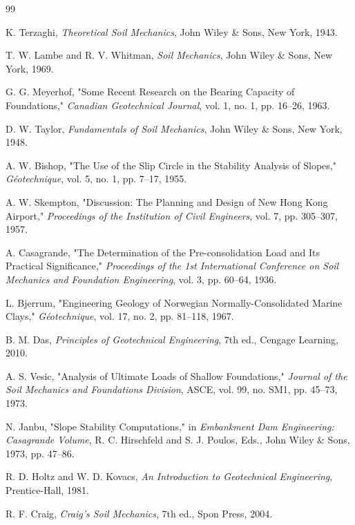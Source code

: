 \documentclass[11pt,a4paper]{article}
\begin{document}

\begin{thebibliography}{99}

K. Terzaghi, \textit{Theoretical Soil Mechanics}, John Wiley \& Sons, New York, 1943.

T. W. Lambe and R. V. Whitman, \textit{Soil Mechanics}, John Wiley \& Sons, New York, 1969.

G. G. Meyerhof, "Some Recent Research on the Bearing Capacity of Foundations," \textit{Canadian Geotechnical Journal}, vol. 1, no. 1, pp. 16--26, 1963.

D. W. Taylor, \textit{Fundamentals of Soil Mechanics}, John Wiley \& Sons, New York, 1948.

A. W. Bishop, "The Use of the Slip Circle in the Stability Analysis of Slopes," \textit{Géotechnique}, vol. 5, no. 1, pp. 7--17, 1955.

A. W. Skempton, "Discussion: The Planning and Design of New Hong Kong Airport," \textit{Proceedings of the Institution of Civil Engineers}, vol. 7, pp. 305--307, 1957.

A. Casagrande, "The Determination of the Pre-consolidation Load and Its Practical Significance," \textit{Proceedings of the 1st International Conference on Soil Mechanics and Foundation Engineering}, vol. 3, pp. 60--64, 1936.

L. Bjerrum, "Engineering Geology of Norwegian Normally-Consolidated Marine Clays," \textit{Géotechnique}, vol. 17, no. 2, pp. 81--118, 1967.

B. M. Das, \textit{Principles of Geotechnical Engineering}, 7th ed., Cengage Learning, 2010.

A. S. Vesic, "Analysis of Ultimate Loads of Shallow Foundations," \textit{Journal of the Soil Mechanics and Foundations Division}, ASCE, vol. 99, no. SM1, pp. 45--73, 1973.

N. Janbu, "Slope Stability Computations," in \textit{Embankment Dam Engineering: Casagrande Volume}, R. C. Hirschfeld and S. J. Poulos, Eds., John Wiley \& Sons, 1973, pp. 47--86.

R. D. Holtz and W. D. Kovacs, \textit{An Introduction to Geotechnical Engineering}, Prentice-Hall, 1981.

R. F. Craig, \textit{Craig's Soil Mechanics}, 7th ed., Spon Press, 2004.


\end{thebibliography}
\end{document}
